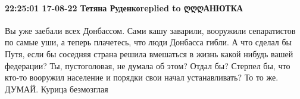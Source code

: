  
 
 
 
 

\paragraph{22:25:01 17-08-22 Тетяна Руденкоreplied to ღღღАНЮТКА}

Вы уже заебали всех Донбассом. Сами кашу заварили, вооружили сепаратистов по
самые уши, а теперь плачетесь, что люди Донбасса гибли. А что сделал бы Путя,
если бы соседняя страна решила вмешаться в жизнь какой нибудь вашей федерации?
Ты, пустоголовая, не думала об этом? Отдал бы? Стерпел бы, что кто-то вооружил
население и порядки свои начал устанавливать? То то же. ДУМАЙ. Курица
безмозглая
